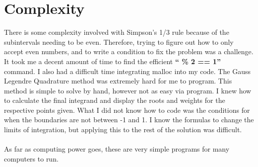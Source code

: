 \documentclass{article}
\begin{document}
\section{Complexity}
There is some complexity involved with Simpson's 1/3 rule because of the subintervals needing to be even.
Therefore, trying to figure out how to only accept even numbers, and to write a condition to fix the problem was a challenge.
It took me a decent amount of time to find the efficient \textbf{`` \% 2 == 1''} command.
I also had a difficult time integrating malloc into my code.
The Gauss Legendre Quadrature method was extremely hard for me to program.
This method is simple to solve by hand, however not as easy via program.
I knew how to calculate the final integrand and display the roots and weights for the respective points given.
What I did not know how to code was the conditions for when the boundaries are not between -1 and 1.
I know the formulas to change the limits of integration, but applying this to the rest of the solution was difficult.
\\
\\ As far as computing power goes, these are very simple programs for many computers to run.
\end{document}
